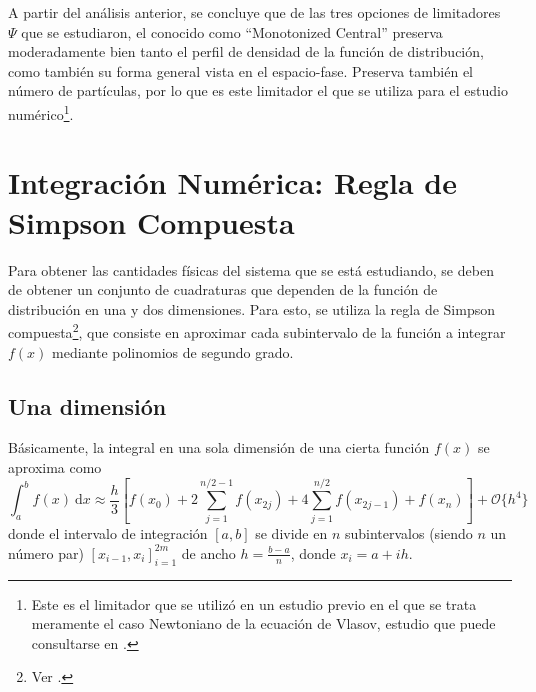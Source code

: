 \documentclass[11pt,twoside,openright,spanish]{report}
\numberwithin{equation}{chapter}
\numberwithin{figure}{chapter}
\numberwithin{table}{chapter}
\begin{document}
A partir del análisis anterior, se concluye que de las tres opciones de limitadores $\Psi$ que se estudiaron, el conocido como ``Monotonized Central'' preserva moderadamente bien tanto el perfil de densidad de la función de distribución, como también su forma general vista en el espacio-fase. Preserva también el número de partículas, por lo que es este limitador el que se utiliza para el estudio numérico\footnote{Este es el limitador que se utilizó en un estudio previo en el que se trata meramente el caso Newtoniano de la ecuación de Vlasov, estudio que puede consultarse en \citet{Jimenez2016}.}.

\section{Integración Numérica: Regla de Simpson Compuesta}
\noindent
Para obtener las cantidades físicas del sistema que se está estudiando, se deben de obtener un conjunto de cuadraturas que dependen de la función de distribución en una y dos dimensiones.  Para esto, se utiliza la regla de Simpson compuesta\footnote{Ver \citet{mayers}.}, que consiste en aproximar cada subintervalo de la función a integrar $f(x)$ mediante polinomios de segundo grado. 

\subsection{Una dimensión}
\noindent

Básicamente, la integral en una sola dimensión de una cierta función $f(x)$ se aproxima como
\begin{equation}
\int_{a}^{b}f\left(x\right)\ \text{d}x\approx\frac{h}{3}\left[f\left(x_0\right)+2\sum_{j=1}^{n/2-1}f(x_{2j})+4\sum_{j=1}^{n/2}f(x_{2j-1})+f(x_n)\right]+\mathcal{O}\{h^4\}
\end{equation}
donde el intervalo de integración $[a,b]$ se divide en $n$ subintervalos (siendo $n$ un número par) $\left[x_{i-1},x_i\right]_{i=1}^{2m}$ de ancho $h=\frac{b-a}{n}$, donde $x_i=a+ih$. 
\end{document}
